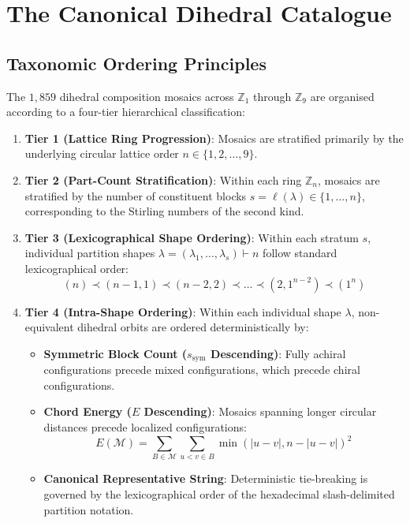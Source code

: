 \chapter{The Canonical Dihedral Catalogue}
\label{chap:canonical-taxonomy}

\section{Taxonomic Ordering Principles}

The $1{,}859$ dihedral composition mosaics across $\mathbb{Z}_1$ through $\mathbb{Z}_9$ are organised according to a four-tier hierarchical classification:

\begin{enumerate}
    \item \textbf{Tier 1 (Lattice Ring Progression)}: Mosaics are stratified primarily by the underlying circular lattice order $n \in \{1, 2, \dots, 9\}$.
    
    \item \textbf{Tier 2 (Part-Count Stratification)}: Within each ring $\mathbb{Z}_n$, mosaics are stratified by the number of constituent blocks $s = \ell(\lambda) \in \{1, \dots, n\}$, corresponding to the Stirling numbers of the second kind.
    
    \item \textbf{Tier 3 (Lexicographical Shape Ordering)}: Within each stratum $s$, individual partition shapes $\lambda = (\lambda_1, \dots, \lambda_s) \vdash n$ follow standard lexicographical order:
    \begin{equation}
    (n) \prec (n-1, 1) \prec (n-2, 2) \prec \dots \prec (2, 1^{n-2}) \prec (1^n)
    \end{equation}
    
    \item \textbf{Tier 4 (Intra-Shape Ordering)}: Within each individual shape $\lambda$, non-equivalent dihedral orbits are ordered deterministically by:
    \begin{itemize}
        \item \textbf{Symmetric Block Count ($s_{\text{sym}}$ Descending)}: Fully achiral configurations precede mixed configurations, which precede chiral configurations.
        \item \textbf{Chord Energy ($E$ Descending)}: Mosaics spanning longer circular distances precede localized configurations:
        \begin{equation}
        E(\mathcal{M}) = \sum_{B \in \mathcal{M}} \sum_{u < v \in B} \min(|u - v|, n - |u - v|)^2
        \end{equation}
        \item \textbf{Canonical Representative String}: Deterministic tie-breaking is governed by the lexicographical order of the hexadecimal slash-delimited partition notation.
    \end{itemize}
\end{enumerate}

